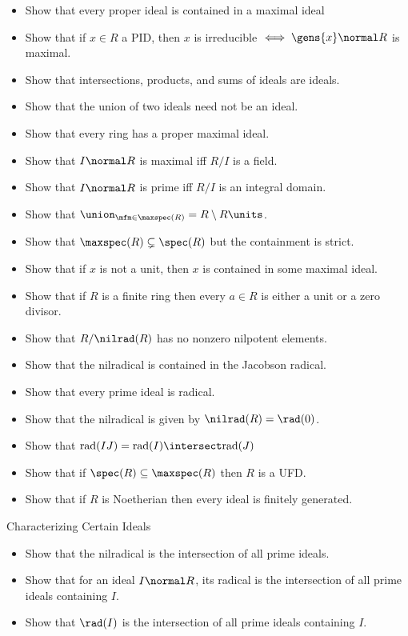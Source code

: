\begin{itemize}
\tightlist
\item
  Show that every proper ideal is contained in a maximal ideal
\item
  Show that if \(x\in R\) a PID, then \(x\) is irreducible
  \(\iff \gens{x}\normal R\) is maximal.
\item
  Show that intersections, products, and sums of ideals are ideals.
\item
  Show that the union of two ideals need not be an ideal.
\item
  Show that every ring has a proper maximal ideal.
\item
  Show that \(I\normal R\) is maximal iff \(R/I\) is a field.
\item
  Show that \(I \normal R\) is prime iff \(R/I\) is an integral domain.
\item
  Show that \(\union_{\mfm \in \maxspec(R)} = R\setminus R\units\).
\item
  Show that \(\maxspec(R) \subsetneq \spec(R)\) but the containment is
  strict.
\item
  Show that if \(x\) is not a unit, then \(x\) is contained in some
  maximal ideal.
\item
  Show that if \(R\) is a finite ring then every \(a\in R\) is either a
  unit or a zero divisor.
\item
  Show that \(R/\mathfrak \nilrad(R)\) has no nonzero nilpotent
  elements.
\item
  Show that the nilradical is contained in the Jacobson radical.
\item
  Show that every prime ideal is radical.
\item
  Show that the nilradical is given by \(\nilrad(R) = \rad(0)\).
\item
  Show that \(\text{rad}(IJ) = \text{rad}(I) \intersect \text{rad}(J)\)
\item
  Show that if \(\spec(R) \subseteq \maxspec(R)\) then \(R\) is a UFD.
\item
  Show that if \(R\) is Noetherian then every ideal is finitely
  generated.
\end{itemize}

Characterizing Certain Ideals

\begin{itemize}
\tightlist
\item
  Show that the nilradical is the intersection of all prime ideals.
\item
  Show that for an ideal \(I\normal R\), its radical is the intersection
  of all prime ideals containing \(I\).
\item
  Show that \(\rad(I)\) is the intersection of all prime ideals
  containing \(I\).
\end{itemize}

